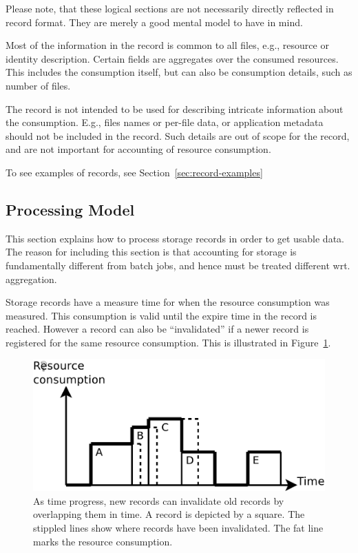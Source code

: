 Please note, that these logical sections are not necessarily directly reflected
in record format. They are merely a good mental model to have in mind.

Most of the information in the record is common to all files, e.g., resource or
identity description. Certain fields are aggregates over the consumed
resources. This includes the consumption itself, but can also be consumption
details, such as number of files.

The record is not intended to be used for describing intricate information
about the consumption. E.g., files names or per-file data, or application
metadata should not be included in the record. Such details are out of scope
for the record, and are not important for accounting of resource consumption.

To see examples of records, see Section~\ref{sec:record-examples}


\subsection{Processing Model}

This section explains how to process storage records in order to get usable
data. The reason for including this section is that accounting for storage is
fundamentally different from batch jobs, and hence must be treated different
wrt. aggregation.

Storage records have a measure time for when the resource consumption was
measured. This consumption is valid until the expire time in the record is
reached. However a record can also be ``invalidated'' if a newer record is
registered for the same resource consumption. This is illustrated in
Figure~\ref{fig:consumptionprogress}.

\begin{figure}[htb]
  \begin{center}
    \includegraphics[width=12cm]{figures/consumptionprogress}
    \caption{As time progress, new records can invalidate old records by
    overlapping them in time. A record is depicted by a square. The stippled
    lines show where records have been invalidated. The fat line marks the
    resource consumption.}
    \label{fig:consumptionprogress}
  \end{center}
\end{figure}

